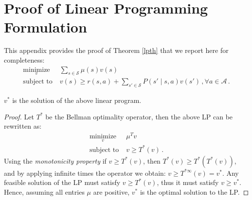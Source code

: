 \chapter{Proof of Linear Programming Formulation}
\label{LPproof}
\thispagestyle{empty}

\noindent This appendix provides the proof of Theorem \ref{lpth} that we report here for completeness:
\begin{align*}
	\underset{v}{\text{minimize}} & \; \sum_{s \in \mathcal{S}} \mu(s) v(s) \\
	\text{subject to} &  \; v(s) \geq r(s,a) + \sum_{s' \in \mathcal{S}} P(s' \mid s,a) v(s') \, , \forall a \in \mathcal{A} \, .
\end{align*} 

\begin{theorem*}
$v^*$ is the solution of the above linear program.
\end{theorem*}

\begin{proof}
	Let $T^*$ be the Bellman optimality operator, then the above LP can be rewritten as:
	\begin{align*}
	\underset{v}{\text{minimize}} & \; \mu^T v \\
	\text{subject to} &  \; v \geq T^* (v) \, .
\end{align*} 
Using the \textit{monotonicity property} if $v \geq T^*(v)$, then $T^*(v) \geq T^*(T^*(v))$, and by applying infinite times the operator we obtain: $v \geq T^{* \infty} (v) = v^*$. Any feasible solution of the LP must satisfy $v \geq T^* (v)$, thus it must satisfy  $v \geq v^*$. Hence, assuming all entries $\mu$ are positive, $v^*$ is the optimal solution to the LP.
\end{proof}